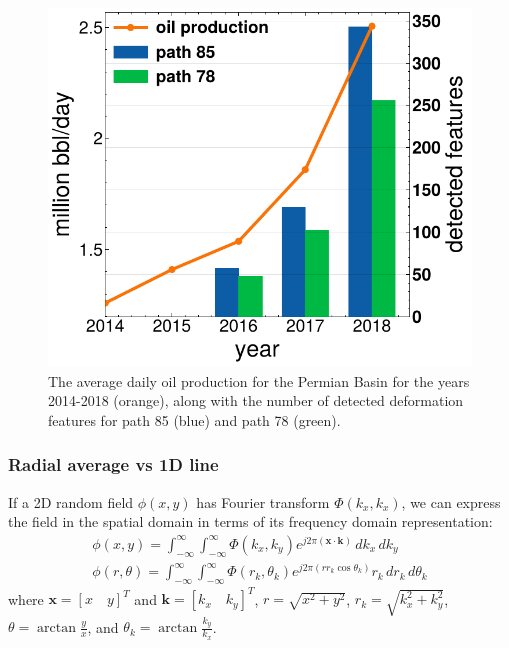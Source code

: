 \documentclass{utexasthesis}
\begin{document}
\begin{figure}[hbt!]
\centering 
\includegraphics[width=0.98\linewidth]{paper2/figures/figure_discussion_oil_vs_blob_count.pdf}
\caption{
The average daily oil production for the Permian Basin for the years 2014-2018 (orange), along with the number of detected deformation features for path 85 (blue) and path 78 (green).
}
\label{fig:discussion-oil-blob-count}
\end{figure}

\subsubsection{Radial average vs 1D line}

If a 2D random field $\phi(x, y)$ has Fourier transform $\Phi(k_x, k_x)$, we can express the field in the spatial domain in terms of its frequency domain representation:
\begin{gather}
    \phi(x, y) =  \int_{-\infty}^{\infty} \int_{-\infty}^{\infty} \Phi(k_x, k_y) e ^{j 2 \pi (\bm{x} \cdot \bm{k}) } \, d k_x \,d k_y \\
   \phi(r, \theta) = \int_{-\infty}^{\infty} \int_{-\infty}^{\infty} \Phi(r_k, \theta_k) e ^{j 2 \pi (r r_k \cos \theta_k ) } r_k \, d r_k \,d \theta_k
\end{gather}
where $\bm{x} = [x \quad y]^T$ and $\bm{k} = [k_x \quad k_y]^T$, $r = \sqrt{x^2 + y^2}$,  $r_k = \sqrt{k_x^2 + k_y^2}$, $\theta = \arctan \frac{y}{x}$, and $\theta_k = \arctan \frac{k_y}{k_x}$.
\end{document}
